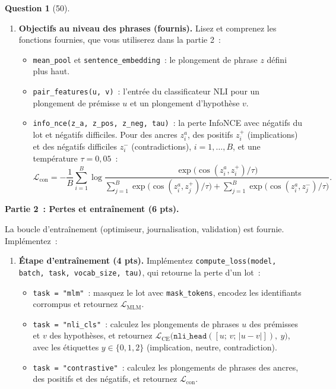 \documentclass[12pt]{article}
\theoremstyle{definition}
\newtheorem{exercise}{Question}%
\begin{document}
\begin{exercise}[50]
\begin{enumerate}
  \item \textbf{Objectifs au niveau des phrases (fournis).} Lisez et comprenez les fonctions fournies, que vous utiliserez
  dans la partie 2~:
  \begin{itemize}
    \item \texttt{mean\_pool} et \texttt{sentence\_embedding}~: le plongement de phrase $z$ défini plus haut.
    \item \texttt{pair\_features(u, v)}~: l'entrée du classificateur NLI pour un plongement de prémisse $u$ et un
          plongement d'hypothèse $v$.
    \item \texttt{info\_nce(z\_a, z\_pos, z\_neg, tau)}~: la perte InfoNCE avec négatifs du lot et négatifs
          difficiles. Pour des ancres $z^a_i$, des positifs $z^+_i$ (implications) et des négatifs difficiles
          $z^-_i$ (contradictions), $i = 1, \dots, B$, et une température $\tau = 0{,}05$~:
          \[
            \mathcal{L}_{\text{con}} = -\frac{1}{B} \sum_{i=1}^{B} \log
              \frac{\exp\!\big(\cos(z^a_i, z^+_i)/\tau\big)}
                   {\sum_{j=1}^{B} \exp\!\big(\cos(z^a_i, z^+_j)/\tau\big)
                    + \sum_{j=1}^{B} \exp\!\big(\cos(z^a_i, z^-_j)/\tau\big)}.
          \]
  \end{itemize}
\end{enumerate}

\textbf{Partie 2~: Pertes et entraînement (6 pts).}

La boucle d'entraînement (optimiseur, journalisation, validation) est fournie. Implémentez~:

\begin{enumerate}
  \item \textbf{Étape d'entraînement (4 pts).} Implémentez \texttt{compute\_loss(model, batch, task, vocab\_size, tau)},
  qui retourne la perte d'un lot~:
  \begin{itemize}
    \item \texttt{task = "mlm"}~: masquez le lot avec \texttt{mask\_tokens}, encodez les identifiants
          corrompus et retournez $\mathcal{L}_{\text{MLM}}$.
    \item \texttt{task = "nli\_cls"}~: calculez les plongements de phrases $u$ des prémisses et $v$ des hypothèses,
          et retournez $\mathcal{L}_{\text{CE}}\big(\texttt{nli\_head}([u;\, v;\, |u - v|]),\ y\big)$, avec les
          étiquettes $y \in \{0, 1, 2\}$ (implication, neutre, contradiction).
    \item \texttt{task = "contrastive"}~: calculez les plongements de phrases des ancres, des positifs et des
          négatifs, et retournez $\mathcal{L}_{\text{con}}$.
  \end{itemize}


\end{enumerate}
\end{exercise}
\end{document}

